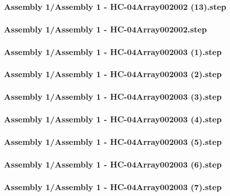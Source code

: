 \documentclass[a4paper,12pt]{article}
\begin{document}
\begin{lstlising}[language=C++]
\subsubsection{Assembly 1/Assembly 1 - HC-04Array002002 (13).step}

\subsubsection{Assembly 1/Assembly 1 - HC-04Array002002.step}

\subsubsection{Assembly 1/Assembly 1 - HC-04Array002003 (1).step}

\subsubsection{Assembly 1/Assembly 1 - HC-04Array002003 (2).step}

\subsubsection{Assembly 1/Assembly 1 - HC-04Array002003 (3).step}

\subsubsection{Assembly 1/Assembly 1 - HC-04Array002003 (4).step}

\subsubsection{Assembly 1/Assembly 1 - HC-04Array002003 (5).step}

\subsubsection{Assembly 1/Assembly 1 - HC-04Array002003 (6).step}

\subsubsection{Assembly 1/Assembly 1 - HC-04Array002003 (7).step}


\end{lstlising}
\end{document}
